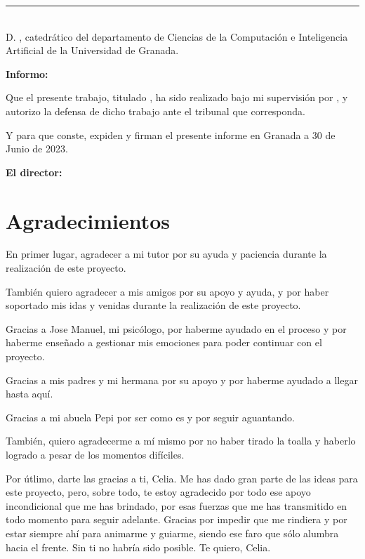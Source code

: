 \cleardoublepage

\thispagestyle{empty}

\noindent\rule[-1ex]{\textwidth}{2pt}\\[4.5ex]

D. \textbf{\tutor}, catedrático del departamento de Ciencias de la
Computación e Inteligencia Artificial de la Universidad de Granada.

\vspace{0.5cm}

\textbf{Informo:}

\vspace{0.5cm}

Que el presente trabajo, titulado \textit{\textbf{\titulo}},
ha sido realizado bajo mi supervisión por \textbf{\minombre}, y autorizo la defensa de dicho trabajo ante el tribunal
que corresponda.

\vspace{0.5cm}

Y para que conste, expiden y firman el presente informe en Granada a 30 de Junio de 2023.

\vspace{1cm}

\textbf{El director: }

\vspace{5cm}

\noindent \textbf{\tutor}

\chapter*{Agradecimientos}

{ \setlength{\parskip}{7mm} %
En primer lugar, agradecer a mi tutor \tutor{} por su ayuda y paciencia durante la realización
de este proyecto.

También quiero agradecer a mis amigos por su apoyo y ayuda, y por haber soportado mis
idas y venidas durante la realización de este proyecto.

Gracias a Jose Manuel, mi psicólogo, por haberme ayudado en el proceso y por haberme
enseñado a gestionar mis emociones para poder continuar con el proyecto.

Gracias a mis padres y mi hermana por su apoyo y por haberme ayudado a llegar hasta aquí.

Gracias a mi abuela Pepi por ser como es y por seguir aguantando.

También, quiero agradecerme a mí mismo por no haber tirado la toalla y haberlo logrado a
pesar de los momentos difíciles.

Por útlimo, darte las gracias a ti, Celia. Me has dado gran parte de las ideas para este
proyecto, pero, sobre todo, te estoy agradecido por todo ese apoyo incondicional que me has
brindado, por esas fuerzas que me has transmitido en todo momento para seguir adelante.
Gracias por impedir que me rindiera y por estar siempre ahí para animarme y guiarme, siendo
ese faro que sólo alumbra hacia el frente. Sin ti no habría sido posible. Te quiero, Celia.
}